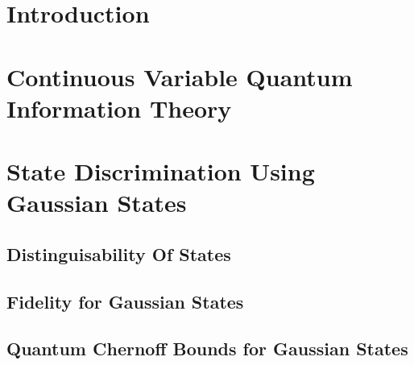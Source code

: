 \documentclass[12pt,a4paper]{article}
\numberwithin{equation}{section}
\begin{document}
\tableofcontents
\newpage

\section{Introduction}
	
\newpage

\section{Continuous Variable Quantum Information Theory}
	
	
\newpage

\section{State Discrimination Using Gaussian States}
	
    \subsection{Distinguisability Of States}
    
    \subsection{Fidelity for Gaussian States}
    
	\subsection{Quantum Chernoff Bounds for Gaussian States}
    
	

\printbibliography[heading=bibintoc,title={References}]
\end{document}

